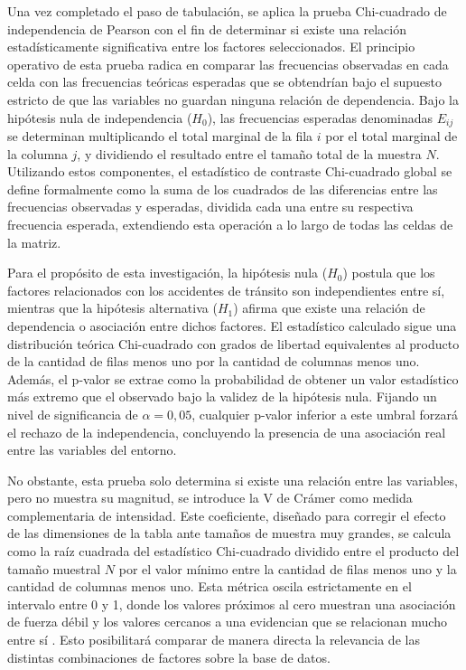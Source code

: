 \documentclass[12pt]{article}
\begin{document}
Una vez completado el paso de tabulación, se aplica la prueba Chi-cuadrado de independencia 
de Pearson con el fin de determinar si existe una relación estadísticamente significativa 
entre los factores seleccionados. El principio operativo de esta prueba radica en comparar 
las frecuencias observadas en cada celda con las frecuencias teóricas esperadas que se 
obtendrían bajo el supuesto estricto de que las variables no guardan ninguna relación de 
dependencia. Bajo la hipótesis nula de independencia ($H_0$), las frecuencias esperadas 
denominadas $E_{ij}$ se determinan multiplicando el total marginal de la fila $i$ por el 
total marginal de la columna $j$, y dividiendo el resultado entre el tamaño total de la 
muestra $N$. Utilizando estos componentes, el estadístico de contraste Chi-cuadrado global 
se define formalmente como la suma de los cuadrados de las diferencias entre las frecuencias 
observadas y esperadas, dividida cada una entre su respectiva frecuencia esperada, extendiendo 
esta operación a lo largo de todas las celdas de la matriz.

Para el propósito de esta investigación, la hipótesis nula ($H_0$) postula que los factores 
relacionados con los accidentes de tránsito son independientes entre sí, mientras que la 
hipótesis alternativa ($H_1$) afirma que existe una relación de dependencia o asociación 
entre dichos factores. El estadístico calculado sigue una distribución teórica Chi-cuadrado 
con grados de libertad equivalentes al producto de la cantidad de filas menos uno por la 
cantidad de columnas menos uno. Además, el p-valor se extrae como la probabilidad de obtener 
un valor estadístico más extremo que el observado bajo la validez de la hipótesis nula. 
Fijando un nivel de significancia de $\alpha = 0,05$, cualquier p-valor inferior a este 
umbral forzará el rechazo de la independencia, concluyendo la presencia de una asociación 
real entre las variables del entorno.

No obstante, esta prueba solo determina si existe una relación entre las variables, 
pero no muestra su magnitud, se introduce la V de Crámer como medida complementaria de 
intensidad. Este coeficiente, diseñado para corregir el efecto de las dimensiones de la 
tabla ante tamaños de muestra muy grandes, se calcula como la raíz cuadrada del estadístico 
Chi-cuadrado dividido entre el producto del tamaño muestral $N$ por el valor mínimo entre la 
cantidad de filas menos uno y la cantidad de columnas menos uno. Esta métrica oscila 
estrictamente en el intervalo entre 0 y 1, donde los valores próximos al cero muestran 
una asociación de fuerza débil y los valores cercanos a una evidencian que se relacionan 
mucho entre sí \parencite{McHugh2013}. Esto posibilitará comparar de manera directa la relevancia de las distintas combinaciones de factores sobre la base de datos.
\end{document}
